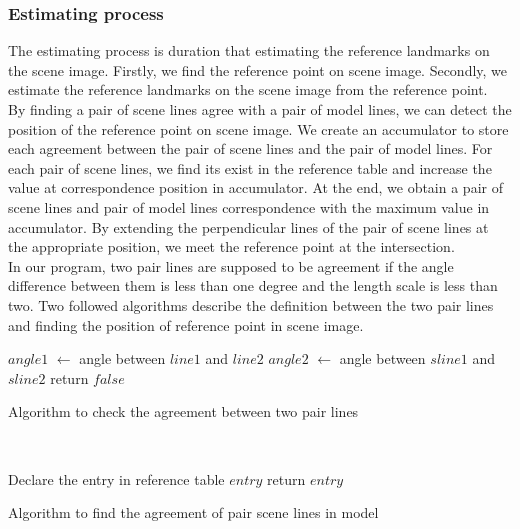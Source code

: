 \subsubsection{Estimating process}
The estimating process is duration that estimating the reference landmarks on the scene image. Firstly, we find the reference point on scene image. Secondly, we estimate the reference landmarks on the scene image from the reference point.\\[0.2cm]
By finding a pair of scene lines agree with a pair of model lines, we can detect the position of the reference point on scene image. We create an accumulator to store each agreement between the pair of scene lines and the pair of model lines. For each pair of scene lines, we find its exist in the reference table and increase the value at correspondence position in accumulator. At the end, we obtain a pair of scene lines and pair of model lines correspondence with the maximum value in accumulator. By extending the perpendicular lines of the pair of scene lines at the appropriate position, we meet the reference point at the intersection.\\[0.2cm]
In our program, two pair lines are supposed to be agreement if the angle difference between them is less than one degree and the length scale is less than two. Two followed algorithms describe the definition between the two pair lines and finding the position of reference point in scene image.\\[0.2cm]
\begin{algorithm}[H]
\Indm 
{}
\Indp
$angle1$ $\leftarrow$ angle between $line1$ and $line2$\;
$angle2$ $\leftarrow$ angle between $sline1$ and $sline2$\;
return $false$ \;
\caption{Algorithm to check the agreement between two pair lines}
\end{algorithm}~\\[0.2cm]
\begin{algorithm}[H]
\Indm 
{}
\Indp
Declare the entry in reference table $entry$ \;
return $entry$ \;
\caption{Algorithm to find the agreement of pair scene lines in model}
\end{algorithm}~\\[0.2cm]
